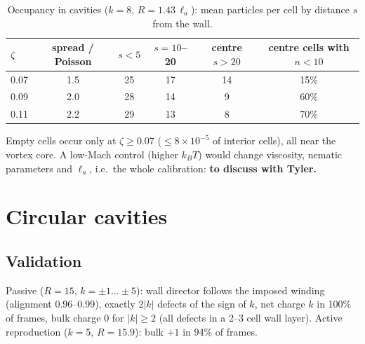 \documentclass[11pt,a4paper]{article}
\newcommand{\la}{\ell_a}
\begin{document}
\begin{table}[h]\centering\small
\caption{Occupancy in cavities ($k=8$, $R=1.43\,\la$): mean particles per cell by distance $s$ from the wall.}\label{tab:dens}
\begin{tabular}{lccccc}\toprule
$\zeta$ & spread / Poisson & $s<5$ & $s=10$--20 & centre $s>20$ & centre cells with $n<10$\\\midrule
0.07 & 1.5 & 25 & 17 & 14 & 15\%\\
0.09 & 2.0 & 28 & 14 & 9 & 60\%\\
0.11 & 2.2 & 29 & 13 & 8 & 70\%\\\bottomrule
\end{tabular}
\end{table}
Empty cells occur only at $\zeta\ge0.07$ ($\le8\times10^{-5}$ of interior cells), all near the vortex core. A low-Mach
control (higher $k_BT$) would change viscosity, nematic parameters and $\la$, i.e.\ the whole calibration:
\textbf{to discuss with Tyler.}

\section{Circular cavities}
\subsection{Validation}
Passive ($R=15$, $k=\pm1\dots\pm5$): wall director follows the imposed winding (alignment 0.96--0.99), exactly
$2|k|$ defects of the sign of $k$, net charge $k$ in 100\% of frames, bulk charge 0 for $|k|\ge2$ (all defects
in a 2--3 cell wall layer). Active reproduction ($k=5$, $R=15.9$): bulk $+1$ in 94\% of frames.
\end{document}
